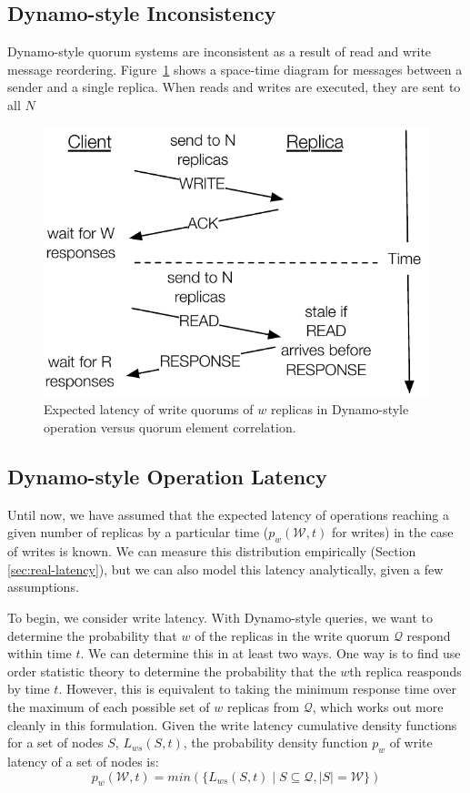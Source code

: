 \documentclass{vldb}
\begin{document}
\subsection{Dynamo-style Inconsistency}

Dynamo-style quorum systems are inconsistent as a result of read and
write message reordering.  Figure~\ref{fig:dynamostale} shows a
space-time diagram for messages between a sender and a single replica.
When reads and writes are executed, they are sent to all $N$

\begin{figure}
\centering
\includegraphics[width=.8\columnwidth]{figs/dynamostale.pdf}
\caption{Expected latency of write quorums of $w$ replicas in Dynamo-style operation versus quorum element correlation.}
\label{fig:dynamostale}
\end{figure}

\subsection{Dynamo-style Operation Latency}

\label{sec:dynamo-prop}

Until now, we have assumed that the expected latency of operations
reaching a given number of replicas by a particular time
($p_w(\mathcal{W}, t)$ for writes) in the case of writes is known.  We
can measure this distribution empirically (Section
\ref{sec:real-latency}), but we can also model this latency
analytically, given a few assumptions.

To begin, we consider write latency.  With Dynamo-style queries, we
want to determine the probability that $w$ of the replicas in the
write quorum $\mathcal{Q}$ respond within time $t$.  We can determine
this in at least two ways.  One way is to find use order statistic
theory to determine the probability that the $w$th replica reasponds
by time $t$.  However, this is equivalent to taking the minimum
response time over the maximum of each possible set of $w$ replicas
from $\mathcal{Q}$, which works out more cleanly in this formulation.
Given the write latency cumulative density functions for a set of
nodes $S$, $L_{ws}(S, t)$, the probability density function $p_w$ of
write latency of a set of nodes is:
\begin{equation}
p_w(\mathcal{W}, t) = min(\{L_{ws}(S, t) \mid S \subseteq \mathcal{Q}, |S| = \mathcal{W}\})
\end{equation}
\end{document}

